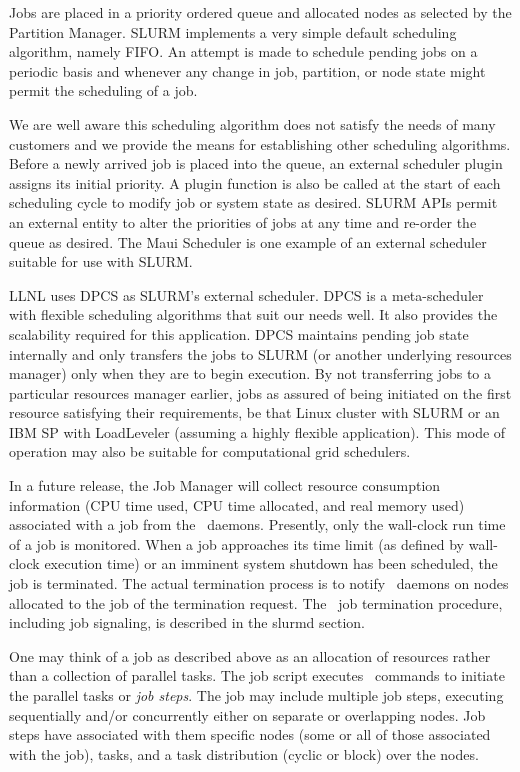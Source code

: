 \documentclass[10pt,onecolumn,times]{../common/llncs}
\begin{document}
{Jobs are placed in a priority ordered queue and allocated nodes as
selected by the Partition Manager.  SLURM implements a very simple default
scheduling algorithm, namely FIFO.  An attempt is made to schedule pending
jobs on a periodic basis and whenever any change in job, partition,
or node state might permit the scheduling of a job.

We are well aware this scheduling algorithm does not satisfy the needs
of many customers and we provide the means for establishing other
scheduling algorithms. Before a newly arrived job is placed into the
queue, an external scheduler plugin assigns its initial priority.  
A plugin function is also be called at the start of each scheduling
cycle to modify job or system state as desired.  SLURM APIs permit an
external entity to alter the priorities of jobs at any time and re-order
the queue as desired.  The Maui Scheduler\cite{Jackson2001,Maui2002}
is one example of an external scheduler suitable for use with SLURM.

LLNL uses DPCS\cite{DPCS2002} as SLURM's external scheduler. 
DPCS is a meta-scheduler with flexible scheduling algorithms that 
suit our needs well. 
It also provides the scalability required for this application.
DPCS maintains pending job state internally and only transfers the 
jobs to SLURM (or another underlying resources manager) only when 
they are to begin execution. 
By not transferring jobs to a particular resources manager earlier, 
jobs as assured of being initiated on the first resource satisfying 
their requirements, be that Linux cluster with SLURM or an IBM SP 
with LoadLeveler (assuming a highly flexible application).
This mode of operation may also be suitable for computational grid 
schedulers.

In a future release, the Job Manager will collect resource consumption
information (CPU time used, CPU time allocated, and real memory used)
associated with a job from the \slurmd\ daemons.  Presently, only the
wall-clock run time of a job is monitored.  When a job approaches its
time limit (as defined by wall-clock execution time) or an imminent
system shutdown has been scheduled, the job is terminated.  The actual
termination process is to notify \slurmd\ daemons on nodes allocated
to the job of the termination request.  The \slurmd\ job termination
procedure, including job signaling, is described in the slurmd section.

One may think of a job as described above as an allocation of resources
rather than a collection of parallel tasks.  The job script executes
\srun\ commands to initiate the parallel tasks or {\em job steps}. The
job may include multiple job steps, executing sequentially and/or
concurrently either on separate or overlapping nodes.  Job steps have
associated with them specific nodes (some or all of those associated with
the job), tasks, and a task distribution (cyclic or block) over the nodes.

}
\end{document}
